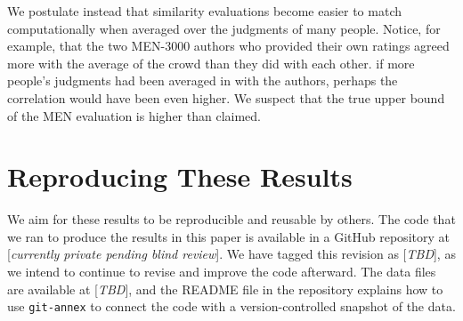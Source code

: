\documentclass[letterpaper]{article}
\begin{document}
We postulate instead that similarity evaluations become easier to match
computationally when averaged over the judgments of many people. Notice, for
example, that the two MEN-3000 authors who provided their own ratings
agreed more with the average of the crowd than they did with each other.
if more people's judgments had been averaged in with the authors, perhaps the
correlation would have been even higher. We suspect that the true upper bound
of the MEN evaluation is higher than claimed.

\section{Reproducing These Results}

We aim for these results to be reproducible and reusable by others. The code
that we ran to produce the results in this paper is available in a GitHub
repository at [{\em currently private pending blind review}]. We have tagged
this revision as [{\em TBD}], as we intend to continue to revise and improve the
code afterward. The data files are available at [{\em TBD}], and the README file
in the repository explains how to use {\tt git-annex} to connect the code
with a version-controlled snapshot of the data.

\begin{CJK*}{UTF8}{min}

\end{CJK*}
\end{document}
